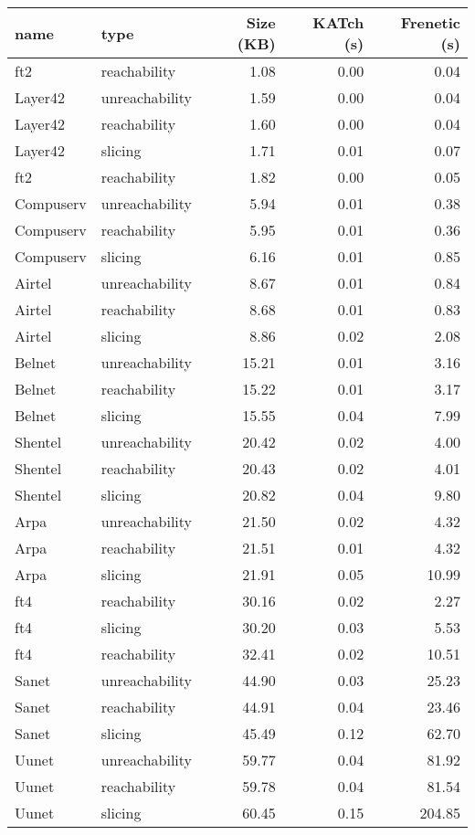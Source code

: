 \begin{tabular}{llrrr}
\toprule
name & type & Size (KB) & KATch (s) & Frenetic (s) \\
\midrule
ft2 & reachability & 1.08 & 0.00 & 0.04 \\
Layer42 & unreachability & 1.59 & 0.00 & 0.04 \\
Layer42 & reachability & 1.60 & 0.00 & 0.04 \\
Layer42 & slicing & 1.71 & 0.01 & 0.07 \\
ft2 & reachability & 1.82 & 0.00 & 0.05 \\
Compuserv & unreachability & 5.94 & 0.01 & 0.38 \\
Compuserv & reachability & 5.95 & 0.01 & 0.36 \\
Compuserv & slicing & 6.16 & 0.01 & 0.85 \\
Airtel & unreachability & 8.67 & 0.01 & 0.84 \\
Airtel & reachability & 8.68 & 0.01 & 0.83 \\
Airtel & slicing & 8.86 & 0.02 & 2.08 \\
Belnet & unreachability & 15.21 & 0.01 & 3.16 \\
Belnet & reachability & 15.22 & 0.01 & 3.17 \\
Belnet & slicing & 15.55 & 0.04 & 7.99 \\
Shentel & unreachability & 20.42 & 0.02 & 4.00 \\
Shentel & reachability & 20.43 & 0.02 & 4.01 \\
Shentel & slicing & 20.82 & 0.04 & 9.80 \\
Arpa & unreachability & 21.50 & 0.02 & 4.32 \\
Arpa & reachability & 21.51 & 0.01 & 4.32 \\
Arpa & slicing & 21.91 & 0.05 & 10.99 \\
ft4 & reachability & 30.16 & 0.02 & 2.27 \\
ft4 & slicing & 30.20 & 0.03 & 5.53 \\
ft4 & reachability & 32.41 & 0.02 & 10.51 \\
Sanet & unreachability & 44.90 & 0.03 & 25.23 \\
Sanet & reachability & 44.91 & 0.04 & 23.46 \\
Sanet & slicing & 45.49 & 0.12 & 62.70 \\
Uunet & unreachability & 59.77 & 0.04 & 81.92 \\
Uunet & reachability & 59.78 & 0.04 & 81.54 \\
Uunet & slicing & 60.45 & 0.15 & 204.85 \\

\end{tabular}

